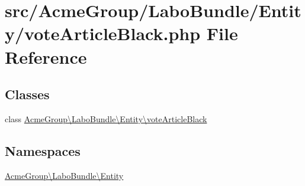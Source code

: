 \hypertarget{vote_article_black_8php}{\section{src/\+Acme\+Group/\+Labo\+Bundle/\+Entity/vote\+Article\+Black.php File Reference}
\label{vote_article_black_8php}
}
\subsection*{Classes}
\begin{DoxyCompactItemize}
\item 
class \hyperlink{class_acme_group_1_1_labo_bundle_1_1_entity_1_1vote_article_black}{Acme\+Group\textbackslash{}\+Labo\+Bundle\textbackslash{}\+Entity\textbackslash{}vote\+Article\+Black}
\end{DoxyCompactItemize}
\subsection*{Namespaces}
\begin{DoxyCompactItemize}
\item 
 \hyperlink{namespace_acme_group_1_1_labo_bundle_1_1_entity}{Acme\+Group\textbackslash{}\+Labo\+Bundle\textbackslash{}\+Entity}
\end{DoxyCompactItemize}
